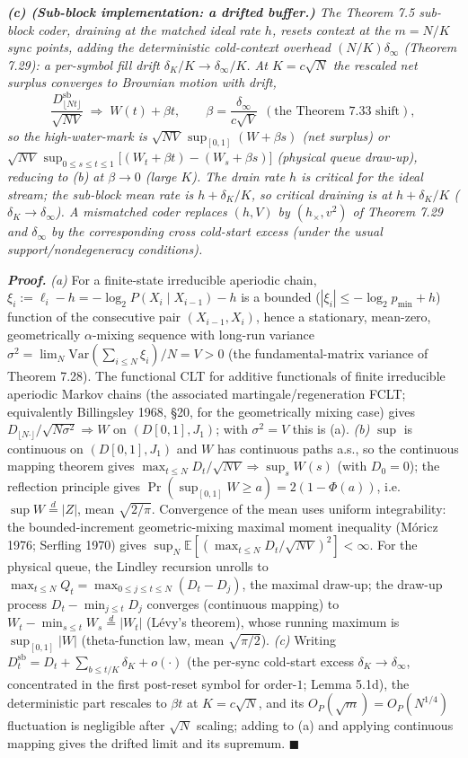 \documentclass[
]{article}
\begin{document}
\emph{\textbf{(c) (Sub-block implementation: a drifted buffer.)} The Theorem 7.5 sub-block
coder, draining at the matched ideal rate $h$, resets context at the $m=N/K$ sync points,
adding the deterministic cold-context overhead $(N/K)\delta_\infty$ (Theorem 7.29): a
per-symbol fill drift $\delta_K/K\to\delta_\infty/K$. At $K=c\sqrt N$ the rescaled net
surplus converges to Brownian motion \emph{with drift},}
\[
  \frac{D^{\mathrm{sb}}_{\lfloor Nt\rfloor}}{\sqrt{NV}}\;\Longrightarrow\;W(t)+\beta t,
  \qquad \beta=\frac{\delta_\infty}{c\sqrt V}\ \ (\text{the Theorem 7.33 shift}),
\]
\emph{so the high-water-mark is $\sqrt{NV}\,\sup_{[0,1]}(W+\beta s)$ (net surplus) or
$\sqrt{NV}\,\sup_{0\le s\le t\le1}\bigl[(W_t+\beta t)-(W_s+\beta s)\bigr]$ (physical queue
draw-up), reducing to (b) at $\beta\to0$ (large $K$). The drain rate $h$ is critical for the ideal stream; the sub-block
mean rate is $h+\delta_K/K$, so critical draining is at $h+\delta_K/K$ ($\delta_K\to
\delta_\infty$). A mismatched coder replaces $(h,V)$ by $(h_\times,v^2)$ of Theorem 7.29 and
$\delta_\infty$ by the corresponding cross cold-start excess (under the usual
support/nondegeneracy conditions).}

\emph{\textbf{Proof.}} \emph{(a)} For a finite-state irreducible aperiodic chain, $\xi_i:=
\ell_i-h=-\log_2 P(X_i\mid X_{i-1})-h$ is a bounded ($|\xi_i|\le-\log_2 p_{\min}+h$) function
of the consecutive pair $(X_{i-1},X_i)$, hence a stationary, mean-zero, geometrically
$\alpha$-mixing sequence with long-run variance $\sigma^2=\lim_N\mathrm{Var}(\sum_{i\le N}
\xi_i)/N=V>0$ (the fundamental-matrix variance of Theorem 7.28). The functional CLT for
additive functionals of finite irreducible aperiodic Markov chains (the associated
martingale/regeneration FCLT; equivalently Billingsley 1968, \S20, for the geometrically
mixing case) gives $D_{\lfloor N\cdot\rfloor}/\sqrt{N\sigma^2}\Rightarrow W$ on $(D[0,1],J_1)$;
with $\sigma^2=V$ this is (a). \emph{(b)} $\sup$ is continuous on $(D[0,1],J_1)$ and $W$ has
continuous paths a.s., so the continuous mapping theorem gives $\max_{t\le N}D_t/\sqrt{NV}
\Rightarrow\sup_sW(s)$ (with $D_0=0$); the reflection principle gives $\Pr(\sup_{[0,1]}W\ge a)
=2(1-\Phi(a))$, i.e.\ $\sup W\overset{d}{=}|Z|$, mean $\sqrt{2/\pi}$. Convergence of the mean
uses uniform integrability: the bounded-increment geometric-mixing maximal moment inequality
(M\'oricz 1976; Serfling 1970) gives $\sup_N\mathbb E[(\max_{t\le N}D_t/\sqrt{NV})^2]<\infty$.
For the physical queue, the Lindley recursion unrolls to $\max_{t\le N}Q_t=\max_{0\le j\le
t\le N}(D_t-D_j)$, the maximal draw-up; the draw-up process $D_t-\min_{j\le t}D_j$ converges
(continuous mapping) to $W_t-\min_{s\le t}W_s\overset{d}{=}|W_t|$ (L\'evy's theorem), whose
running maximum is $\sup_{[0,1]}|W|$ (theta-function law, mean $\sqrt{\pi/2}$). \emph{(c)}
Writing $D^{\mathrm{sb}}_t=D_t+\sum_{b\le t/K}\delta_K+o(\cdot)$ (the per-sync cold-start
excess $\delta_K\to\delta_\infty$, concentrated in the first post-reset symbol for order-$1$;
Lemma 5.1d), the deterministic part rescales to $\beta t$ at $K=c\sqrt N$, and its $O_P(\sqrt
m)=O_P(N^{1/4})$ fluctuation is negligible after $\sqrt N$ scaling; adding to (a) and applying
continuous mapping gives the drifted limit and its supremum. \hfill$\blacksquare$
\end{document}
